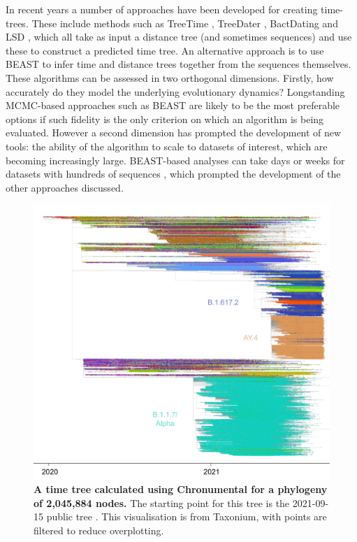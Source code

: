 In recent years a number of approaches have been developed for creating time-trees. These include methods such as TreeTime \citep{Sagulenko2018-kr}, TreeDater \citep{Volz2017-le},  BactDating \citep{Didelot2018-vf} and LSD \citep{To2016-cw} , which all take as input a distance tree (and sometimes sequences) and use these to construct a predicted time tree. An alternative approach is to use BEAST \citep{Suchard2018-ma} to infer time and distance trees together from the sequences themselves. These algorithms can be assessed in two orthogonal dimensions. Firstly, how accurately do they model the underlying evolutionary dynamics? Longstanding MCMC-based approaches such as BEAST are likely to be the most preferable options if such fidelity is the only criterion on which an algorithm is being evaluated. However a second dimension has prompted the development of new tools: the ability of the algorithm to scale to datasets of interest, which are becoming increasingly large. BEAST-based analyses can take days or weeks for datasets with hundreds of sequences \citep{Sagulenko2018-kr}, which prompted the development of the other approaches discussed.

\begin{figure}[t]
\centering
\includegraphics[width=1\linewidth]{Figures/timetree.pdf}
\caption{\textbf{A time tree calculated using Chronumental for a phylogeny of 2,045,884 nodes.} The starting point for this tree is the 2021-09-15 public tree \citep{McBroome2021-fn}. This visualisation is from Taxonium, with points are filtered to reduce overplotting.
}
\label{publictree}
\end{figure}

